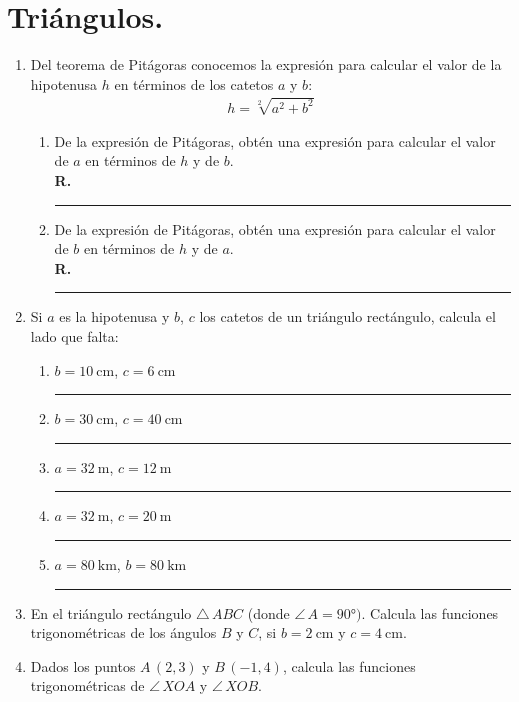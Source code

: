 \documentclass[12pt]{article}
\begin{document}
\section{Triángulos.}

\begin{enumerate}
\item Del teorema de Pitágoras conocemos la expresión para calcular el valor de la hipotenusa $h$ en términos de los catetos $a$ y $b$:
\begin{align*}
h = \sqrt[2]{a^{2} + b^{2}}
\end{align*}
\begin{enumerate}
\item De la expresión de Pitágoras, obtén una expresión para calcular el valor de $a$ en términos de $h$ y de $b$.
\\[1em]
\textbf{R.} \rule{6cm}{0.7pt}
\item De la expresión de Pitágoras, obtén una expresión para calcular el valor de $b$ en términos de $h$ y de $a$.
\\[1em]
\textbf{R.} \rule{6cm}{0.7pt}
\end{enumerate}
\item Si $a$ es la hipotenusa y $b$, $c$ los catetos de un triángulo rectángulo, calcula el lado que falta:
\begin{enumerate}
\item $b = \SI{10}{\centi\meter}$, $c = \SI{6}{\centi\meter}$ \hspace{1cm} \rule{2cm}{0.7pt}
\item $b = \SI{30}{\centi\meter}$, $c = \SI{40}{\centi\meter}$ \hspace{1cm} \rule{2cm}{0.7pt}
\item $a = \SI{32}{\meter}$, $c = \SI{12}{\meter}$ \hspace{1cm} \rule{2cm}{0.7pt}
\item $a = \SI{32}{\meter}$, $c = \SI{20}{\meter}$ \hspace{1cm} \rule{2cm}{0.7pt}
\item $a = \SI{80}{\kilo\meter}$, $b = \SI{80}{\kilo\meter}$ \hspace{1cm} \rule{2cm}{0.7pt}
\end{enumerate}
\item En el triángulo rectángulo $\triangle \, ABC$ (donde $\angle \, A = \ang{90})$. Calcula las funciones trigonométricas de los ángulos $B$ y $C$, si $b = \SI{2}{\centi\meter}$ y $c = \SI{4}{\centi\meter}$.
\item Dados los puntos $A \, (2, 3)$ y $B \, (-1, 4)$, calcula las funciones trigonométricas de \break \hfill $\angle \, XOA$ y $\angle \, XOB$.
\begin{figure}[H]
	\centering
\end{figure}
\end{enumerate}
\end{document}

